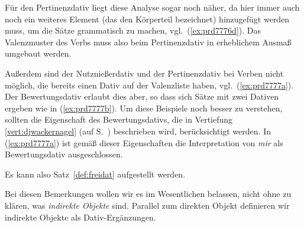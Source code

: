 Für den Pertinenzdativ liegt diese Analyse sogar noch näher, da hier immer auch noch ein weiteres Element (das den Körperteil bezeichnet) hinzugefügt werden muss, um die Sätze grammatisch zu machen, vgl.\ (\ref{ex:prd7776d}).
Das Valenzmuster des Verbs muss also beim Pertinenzdativ in erheblichem Ausmaß umgebaut werden.

\begin{exe}
\end{exe}

Außerdem sind der Nutznießerdativ und der Pertinenzdativ bei Verben nicht möglich, die bereits einen Dativ auf der Valenzliste haben, vgl.\ (\ref{ex:prd7777a}).
Der Bewertungsdativ erlaubt dies aber, so dass sich Sätze mit zwei Dativen ergeben wie in (\ref{ex:prd7777b}).
Um diese Beispiele noch besser zu verstehen, sollten die Eigenschaft des Bewertungsdativs, die in Vertiefung \ref{vert:djwackernagel} (auf S.~\pageref{vert:djwackernagel}) beschrieben wird, berücksichtigt werden.
In (\ref{ex:prd7777a}) ist gemäß dieser Eigenschaften die Interpretation von \textit{mir} als Bewertungsdativ ausgeschlossen.

\begin{exe}
  \ex\label{ex:prd7777}
  \begin{xlist}
  \end{xlist}
\end{exe}

Es kann also Satz~\ref{def:freidat} aufgestellt werden.


Bei diesen Bemerkungen wollen wir es im Wesentlichen belassen, nicht ohne zu klären, was \textit{indirekte Objekte} sind.
Parallel zum direkten Objekt definieren wir indirekte Objekte als Dativ-Ergänzungen.


